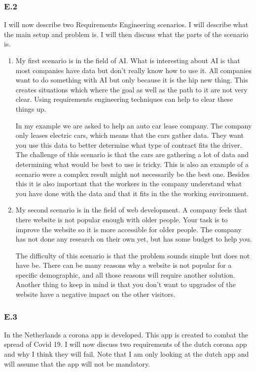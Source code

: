 \documentclass[]{article}
\begin{document}
\subsubsection*{E.2}
I will now describe two Requirements Engineering scenarios. I will describe what
the main setup and problem is. I will then discuss what the parts of the 
scenario is.
\begin{enumerate}
    \item My first scenario is in the field of AI. What is interesting about AI 
    is that most companies have data but don't really know how to use it. All 
    companies want to do something with AI but only because it is the hip new 
    thing. This creates situations which where the goal as well as the path to 
    it are not very clear. Using requirements engineering techniques can help 
    to clear these things up.

    In my example we are asked to help an auto car lease company. The 
    company only leases electric cars, which means that the cars gather data. 
    They want you use this data to better determine what type of contract fits 
    the driver. The challenge of this scenario is that the cars are gathering 
    a lot of data and determining what would be best to use is tricky. This is 
    also an example of a scenario were a complex result might not necessarily 
    be the best one.
    Besides this it is also important that the workers in the company understand 
    what you have done with the data and that it fits in the the working 
    environment. 

    \item My second scenario is in the field of web development. A company feels 
    that there website is not popular enough with older people. Your task is 
    to improve the website so it is more accessible for older people. The 
    company has not done any research on their own yet, but has some budget 
    to help you.

    The difficulty of this scenario is that the problem sounds simple but does 
    not have be. There can be many reasons why a website is not popular for a 
    specific demographic, and all those reasons will require another solution. 
    Another thing to keep in mind is that you don't want to upgrades of the 
    website have a negative impact on the other visitors. 

\end{enumerate}

\subsubsection*{E.3}
In the Netherlands a corona app is developed. This app is created to combat the 
spread of Covid 19. I will now discuss two requirements of the dutch corona 
app and why I think they will fail. Note that I am only looking at the dutch
app and will assume that the app will not be mandatory. 
\end{document}
